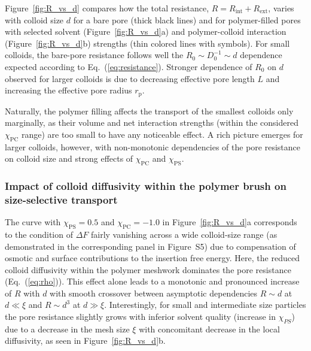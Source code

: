 \documentclass[12pt, a4paper]{article}
\newcommand\todo[1]{\textcolor{red}{#1}}
\begin{document}
Figure~\ref{fig:R_vs_d} compares how the total resistance, $R=R_{\text{int}}+R_{\text{ext}}$, varies with colloid size $d$ for a bare pore (thick black lines) and for polymer-filled pores with selected solvent (Figure~\ref{fig:R_vs_d}a) and polymer-colloid interaction (Figure~\ref{fig:R_vs_d}b) strengths (thin colored lines with symbols).
For small colloids, the bare-pore resistance follows well the $R_0 \sim D_0^{-1} \sim d$ dependence expected according to Eq.~(\ref{eq:resistance}).
Stronger dependence of $R_0$ on $d$ observed for larger colloids is due to decreasing effective pore length $L$ and increasing the effective pore radius $r_{\text{p}}$.

Naturally, the polymer filling affects the transport of the smallest colloids only marginally, as their volume and net interaction strengths (within the considered $\chi_{\text{PC}}$ range) are too small to have any noticeable effect. 
A rich picture emerges for larger colloids, however, with non-monotonic dependencies of the pore resistance on colloid size and strong effects of $\chi_{\text{PC}}$ and $\chi_{\text{PS}}$. 


\subsubsection{Impact of colloid diffusivity within the polymer brush on size-selective transport}

The curve with $\chi_{\text{PS}}=0.5$ and $\chi_{\text{PC}} = -1.0$ in Figure~\ref{fig:R_vs_d}a corresponds to the condition of $\Delta F$ fairly vanishing across a wide colloid-size range (as demonstrated in the corresponding panel in Figure~S5) due to compensation of osmotic and surface contributions to the insertion free energy.
Here, the reduced colloid diffusivity within the polymer meshwork dominates the pore resistance (Eq.~(\ref{eq:rho})). 
This effect alone leads to a monotonic and pronounced increase of $R$ with $d$ with smooth crossover between asymptotic dependencies $R\sim d$ at $d\ll \xi$ and $R\sim d^3$ at $d\gg \xi$. 
Interestingly, for small and intermediate size particles the pore resistance slightly grows with inferior solvent quality (increase in $\chi_{PS}$) due to a decrease in the mesh size $\xi$ with concomitant decrease in the local diffusivity, as seen in Figure~\ref{fig:R_vs_d}b.
  
\end{document}
